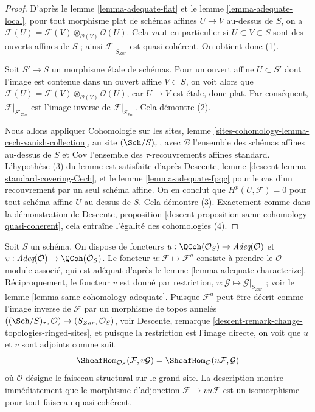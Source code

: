 \begin{proof}
D'après le
lemme \ref{lemma-adequate-flat}
et le
lemme \ref{lemma-adequate-local},
pour tout morphisme plat de schémas affines $U \to V$ au-dessus de $S$,
on a
$\mathcal{F}(U) = \mathcal{F}(V) \otimes_{\mathcal{O}(V)} \mathcal{O}(U)$.
Cela vaut en particulier si $U \subset V \subset S$ sont des ouverts affines de
$S$ ; ainsi $\mathcal{F}|_{S_{Zar}}$ est quasi-cohérent.
On obtient donc (1).

\medskip\noindent
Soit $S' \to S$ un morphisme étale de schémas.
Pour un ouvert affine $U \subset S'$ dont l'image est contenue dans un ouvert affine
$V \subset S$, on voit alors que
$\mathcal{F}(U) = \mathcal{F}(V) \otimes_{\mathcal{O}(V)} \mathcal{O}(U)$,
car $U \to V$ est étale, donc plat. Par conséquent,
$\mathcal{F}|_{S'_{Zar}}$ est l'image inverse de $\mathcal{F}|_{S_{Zar}}$.
Cela démontre (2).

\medskip\noindent
Nous allons appliquer
Cohomologie sur les sites,
lemme \ref{sites-cohomology-lemma-cech-vanish-collection},
au site $(\Sch/S)_\tau$, avec
$\mathcal{B}$ l'ensemble des schémas affines au-dessus de $S$ et
$\text{Cov}$ l'ensemble des $\tau$-recouvrements affines standard.
L'hypothèse (3) du lemme est satisfaite d'après
Descente, lemme \ref{descent-lemma-standard-covering-Cech},
et le
lemme \ref{lemma-adequate-fpqc}
pour le cas d'un recouvrement par un seul schéma affine.
On en conclut que $H^p(U, \mathcal{F}) = 0$ pour tout
schéma affine $U$ au-dessus de $S$. Cela démontre (3).
Exactement comme dans la démonstration de
Descente, proposition \ref{descent-proposition-same-cohomology-quasi-coherent},
cela entraîne l'égalité des cohomologies (4).
\end{proof}

\begin{remark}
\label{remark-compare}
Soit $S$ un schéma. On dispose de foncteurs
$u : \QCoh(\mathcal{O}_S) \to \textit{Adeq}(\mathcal{O})$
et
$v : \textit{Adeq}(\mathcal{O}) \to \QCoh(\mathcal{O}_S)$.
Le foncteur $u : \mathcal{F} \mapsto \mathcal{F}^a$
consiste à prendre le $\mathcal{O}$-module associé, qui est
adéquat d'après le
lemme \ref{lemma-adequate-characterize}.
Réciproquement, le foncteur $v$ est donné par restriction,
$v : \mathcal{G} \mapsto \mathcal{G}|_{S_{Zar}}$ ; voir le
lemme \ref{lemma-same-cohomology-adequate}.
Puisque $\mathcal{F}^a$ peut être décrit comme l'image inverse de
$\mathcal{F}$ par un morphisme de topos annelés
$((\Sch/S)_\tau, \mathcal{O}) \to (S_{Zar}, \mathcal{O}_S)$, voir
Descente, remarque \ref{descent-remark-change-topologies-ringed-sites},
et puisque la restriction est l'image directe, on voit que $u$ et $v$
sont adjoints comme suit
$$
\SheafHom_{\mathcal{O}_S}(\mathcal{F}, v\mathcal{G})
=
\SheafHom_\mathcal{O}(u\mathcal{F}, \mathcal{G})
$$
où $\mathcal{O}$ désigne le faisceau structural sur le grand site.
La description montre immédiatement que le morphisme d'adjonction
$\mathcal{F} \to vu\mathcal{F}$ est un isomorphisme pour tout faisceau
quasi-cohérent.
\end{remark}

